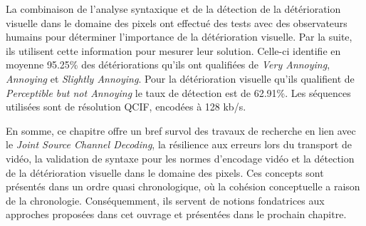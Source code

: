\begin{section}{La combinaison de l'analyse syntaxique et de la
détection de la détérioration visuelle dans le domaine des pixels}
\citeauthor{Farrugia2008} ont effectué des tests avec des observateurs humains
pour déterminer l'importance de la détérioration visuelle. Par la suite, ils
utilisent cette information pour mesurer leur solution. Celle-ci identifie en
moyenne 95.25\% des détériorations qu'ils ont qualifiées de \textit{Very
Annoying}, \textit{Annoying} et \textit{Slightly Annoying}. Pour la
détérioration visuelle qu'ils qualifient de \textit{Perceptible but not
Annoying} le taux de détection est de 62.91\%. Les séquences utilisées sont de
résolution QCIF, encodées à 128 kb/s.

\end{section}

En somme, ce chapitre offre un bref survol des travaux de recherche en lien
avec le \textit{Joint Source Channel Decoding}, la résilience aux erreurs lors
du transport de vidéo, la validation de syntaxe pour les normes d'encodage vidéo
et la détection de la détérioration visuelle dans le domaine des pixels. Ces
concepts sont présentés dans un ordre quasi chronologique, où la cohésion
conceptuelle a raison de la chronologie. Conséquemment, ils servent
de notions fondatrices aux approches proposées dans cet ouvrage et présentées
dans le prochain chapitre.